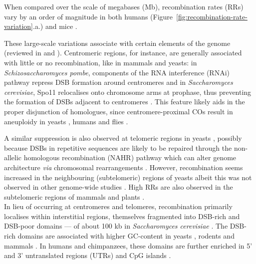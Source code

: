 When compared over the scale of megabases (Mb), recombination rates (RRs) vary by an order of magnitude in both humans (Figure~\ref{fig:recombination-rate-variation}.a.) \citep{nachman2002variation,myers2005finescale} and mice \citep{billings2010patterns, morgan2017structural}.

\pagebreak
These large-scale variations associate with certain elements of the genome (reviewed in \citealp{demassy2013initiation} and \citealp{lam2015mechanism}).
Centromeric regions, for instance, are generally associated with little or no recombination, like in mammals \citep{qiao2012interplay} and yeasts: in \textit{Schizosaccharomyces pombe}, components of the RNA interference (RNAi) pathway repress DSB formation around centromeres \citep{ellermeier2010rnai} and in \textit{Saccharomyces cerevisiae}, Spo11 relocalises onto chromosome arms at prophase, thus preventing the formation of DSBs adjacent to centromeres \citep{kugou2009rec8}.
This feature likely aids in the proper disjunction of homologues, since centromere-proximal COs result in aneuploidy in yeasts \citep{rockmill2006centromereproximal}, humans \citep{hassold2001err} and flies \citep{koehler1996recombination}.

A similar suppression is also observed at telomeric regions in yeasts \citep{blitzblau2007mapping,buhler2007mapping}, possibly because DSBs in repetitive sequences are likely to be repaired through the non-allelic homologous recombination (NAHR) pathway which can alter genome architecture \textit{via} chromosomal rearrangements \citep{sasaki2010genome}.
However, recombination seems increased in the neighbouring (subtelomeric) regions of yeasts \citep{chen2008global,barton2008meiotic} albeit this was not observed in other genome-wide studies \citep{buhler2001dna,pan2011hierarchical}.
High RRs are also observed in the subtelomeric regions of mammals \citep{kong2002highresolution,jensen-seaman2004comparative,pratto2014recombination} and plants \citep{giraut2011genomewide}.\\



In lieu of occurring at centromeres and telomeres, recombination primarily localises within interstitial regions, themselves fragmented into DSB-rich and DSB-poor domains — of about 100 kb in \textit{Saccharomyces cerevisiae} \citep{baudat1997clustering,borde1999use}.
The DSB-rich domains are associated with higher GC-content in yeasts \citep{gerton2000global,petes2001meiotic,marsolier-kergoat2009gc}, rodents \citep{jensen-seaman2004comparative} and mammals \citep{eyre-walker1993recombination,fullerton2001local}.
In humans and chimpanzees, these domains are further enriched in 5’ and 3’ untranslated regions (UTRs) and CpG islands \citep{kong2002highresolution, auton2012finescale}.

